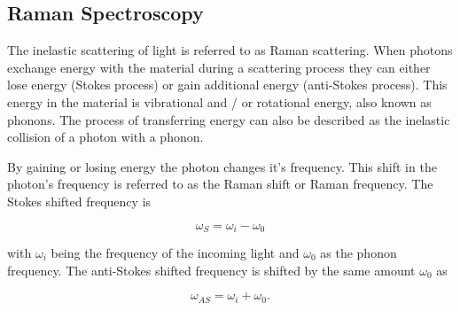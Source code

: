\subsection{Raman Spectroscopy}

The inelastic scattering of light is referred to as Raman scattering. When photons exchange
energy with the material during a scattering process they can either lose energy (Stokes process)
or gain additional energy (anti-Stokes process). This energy in the material is vibrational and / or
rotational energy, also known as phonons. The process of transferring energy can also be described as
the inelastic collision of a photon with a phonon.

By gaining or losing energy the photon changes it's frequency. This shift in the photon's
frequency is referred to as the Raman shift or Raman frequency. The Stokes shifted frequency is

\begin{equation}
  \omega_S=\omega_i-\omega_0
\end{equation}


with $\omega_i$ being the frequency of the incoming light and $\omega_0$ as the phonon frequency.
The anti-Stokes shifted frequency is shifted by the same amount $\omega_0$ as

\begin{equation}
  \omega_{AS}=\omega_i+\omega_0.
\end{equation}
